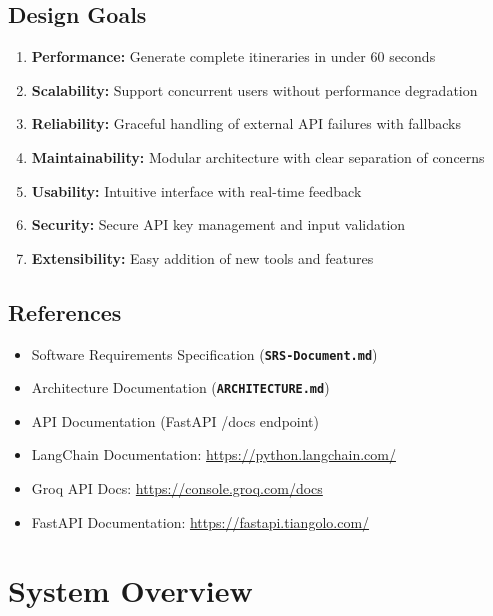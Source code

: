 \documentclass[12pt,a4paper]{report}
\newcommand{\file}[1]{\texttt{\textbf{#1}}}
\begin{document}
\section{Design Goals}

\begin{enumerate}[leftmargin=*]
    \item \textbf{Performance:} Generate complete itineraries in under 60 seconds
    \item \textbf{Scalability:} Support concurrent users without performance degradation
    \item \textbf{Reliability:} Graceful handling of external API failures with fallbacks
    \item \textbf{Maintainability:} Modular architecture with clear separation of concerns
    \item \textbf{Usability:} Intuitive interface with real-time feedback
    \item \textbf{Security:} Secure API key management and input validation
    \item \textbf{Extensibility:} Easy addition of new tools and features
\end{enumerate}

\section{References}

\begin{itemize}[leftmargin=*]
    \item Software Requirements Specification (\file{SRS-Document.md})
    \item Architecture Documentation (\file{ARCHITECTURE.md})
    \item API Documentation (FastAPI /docs endpoint)
    \item LangChain Documentation: \url{https://python.langchain.com/}
    \item Groq API Docs: \url{https://console.groq.com/docs}
    \item FastAPI Documentation: \url{https://fastapi.tiangolo.com/}
\end{itemize}


\chapter{System Overview}
\end{document}
